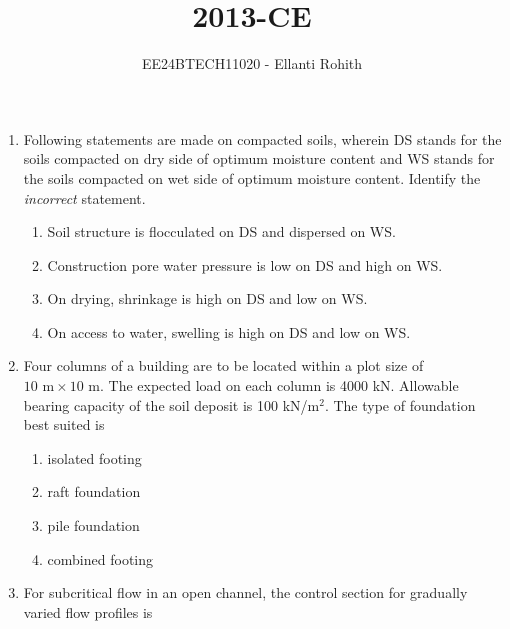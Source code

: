 \documentclass[journal,12pt,onecolumn]{IEEEtran}
\theoremstyle{remark}
\begin{document}

\vspace{3cm}

\title{2013-CE}
\author{EE24BTECH11020 -  Ellanti Rohith}
\maketitle

\renewcommand{\thefigure}{\theenumi}
\renewcommand{\thetable}{\theenumi}





\begin{enumerate}

    \item Following statements are made on compacted soils, wherein DS stands for the soils compacted on dry side of optimum moisture content and WS stands for the soils compacted on wet side of optimum moisture content. Identify the \textit{incorrect} statement. 
    \begin{enumerate}
        \item Soil structure is flocculated on DS and dispersed on WS.
        \item Construction pore water pressure is low on DS and high on WS.
        \item On drying, shrinkage is high on DS and low on WS.
        \item On access to water, swelling is high on DS and low on WS.\\
    \end{enumerate}

    
      
    \item Four columns of a building are to be located within a plot size of $10  \text{ m} \times 10  \text{ m}$. The expected load on each column is 4000 kN. Allowable bearing capacity of the soil deposit is 100 kN/m$^2$. The type of foundation best suited is
    \begin{multicols}{2}
    \begin{enumerate}
        \item isolated footing
        \item raft foundation
        \item pile foundation
        \item combined footing
    \end{enumerate}
    \end{multicols}

    \item For subcritical flow in an open channel, the control section for gradually varied flow profiles is
    

\end{enumerate}
\end{document}

